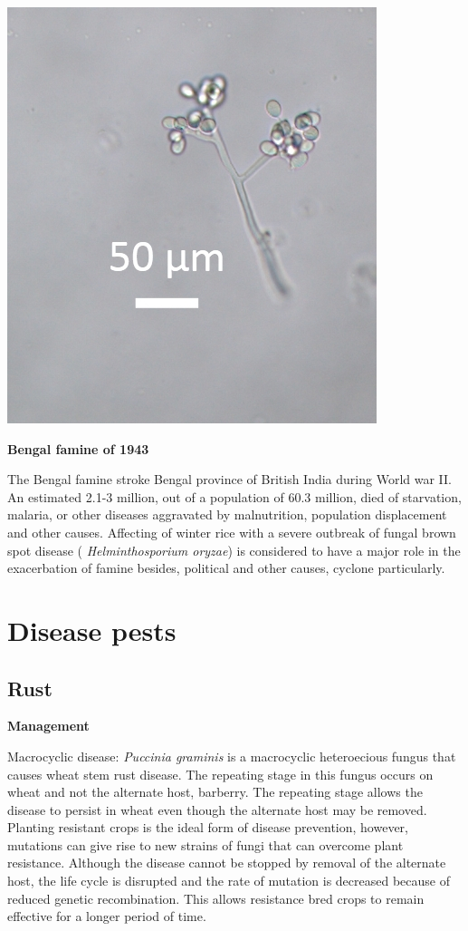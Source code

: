 \documentclass[
  openany]{book}
\begin{document}
\begin{center}\includegraphics[width=0.8\linewidth]{./images/Plasmopara_vitticola} \end{center}

\textbf{Bengal famine of 1943}

The Bengal famine stroke Bengal province of British India during World war II. An estimated 2.1-3 million, out of a population of 60.3 million, died of starvation, malaria, or other diseases aggravated by malnutrition, population displacement and other causes. Affecting of winter rice with a severe outbreak of fungal brown spot disease ( \emph{Helminthosporium oryzae}) is considered to have a major role in the exacerbation of famine besides, political and other causes, cyclone particularly.

\hypertarget{disease-pests}{%
\section{Disease pests}\label{disease-pests}}

\hypertarget{rust}{%
\subsection{Rust}\label{rust}}

\textbf{Management}

Macrocyclic disease: \emph{Puccinia graminis} is a macrocyclic heteroecious fungus that causes wheat stem rust disease. The repeating stage in this fungus occurs on wheat and not the alternate host, barberry. The repeating stage allows the disease to persist in wheat even though the alternate host may be removed. Planting resistant crops is the ideal form of disease prevention, however, mutations can give rise to new strains of fungi that can overcome plant resistance. Although the disease cannot be stopped by removal of the alternate host, the life cycle is disrupted and the rate of mutation is decreased because of reduced genetic recombination. This allows resistance bred crops to remain effective for a longer period of time.
\end{document}
